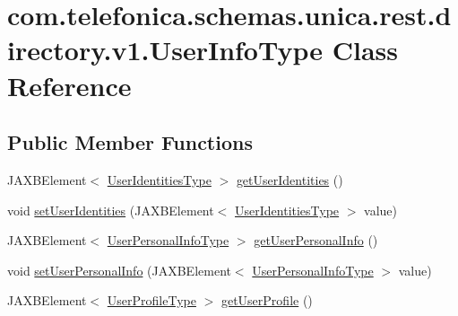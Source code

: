 \hypertarget{classcom_1_1telefonica_1_1schemas_1_1unica_1_1rest_1_1directory_1_1v1_1_1UserInfoType}{
\section{com.telefonica.schemas.unica.rest.directory.v1.UserInfoType Class Reference}
\label{classcom_1_1telefonica_1_1schemas_1_1unica_1_1rest_1_1directory_1_1v1_1_1UserInfoType}
}
\subsection*{Public Member Functions}
\begin{DoxyCompactItemize}
\item 
JAXBElement$<$ \hyperlink{classcom_1_1telefonica_1_1schemas_1_1unica_1_1rest_1_1directory_1_1v1_1_1UserIdentitiesType}{UserIdentitiesType} $>$ \hyperlink{classcom_1_1telefonica_1_1schemas_1_1unica_1_1rest_1_1directory_1_1v1_1_1UserInfoType_a25cefdcfff55dae830ec3e46c5dbe55b}{getUserIdentities} ()
\item 
void \hyperlink{classcom_1_1telefonica_1_1schemas_1_1unica_1_1rest_1_1directory_1_1v1_1_1UserInfoType_ae0df8dfd6f4f7565a9dd9a0c5a83ac6c}{setUserIdentities} (JAXBElement$<$ \hyperlink{classcom_1_1telefonica_1_1schemas_1_1unica_1_1rest_1_1directory_1_1v1_1_1UserIdentitiesType}{UserIdentitiesType} $>$ value)
\item 
JAXBElement$<$ \hyperlink{classcom_1_1telefonica_1_1schemas_1_1unica_1_1rest_1_1directory_1_1v1_1_1UserPersonalInfoType}{UserPersonalInfoType} $>$ \hyperlink{classcom_1_1telefonica_1_1schemas_1_1unica_1_1rest_1_1directory_1_1v1_1_1UserInfoType_a6946233f6ba03348fc049c50722468b2}{getUserPersonalInfo} ()
\item 
void \hyperlink{classcom_1_1telefonica_1_1schemas_1_1unica_1_1rest_1_1directory_1_1v1_1_1UserInfoType_a4a25710f27f33a6cd748538c7cbf6e75}{setUserPersonalInfo} (JAXBElement$<$ \hyperlink{classcom_1_1telefonica_1_1schemas_1_1unica_1_1rest_1_1directory_1_1v1_1_1UserPersonalInfoType}{UserPersonalInfoType} $>$ value)
\item 
JAXBElement$<$ \hyperlink{classcom_1_1telefonica_1_1schemas_1_1unica_1_1rest_1_1directory_1_1v1_1_1UserProfileType}{UserProfileType} $>$ \hyperlink{classcom_1_1telefonica_1_1schemas_1_1unica_1_1rest_1_1directory_1_1v1_1_1UserInfoType_a78da5e185689e6d8b97a6841a4961fad}{getUserProfile} ()
\item 

\end{DoxyCompactItemize}
